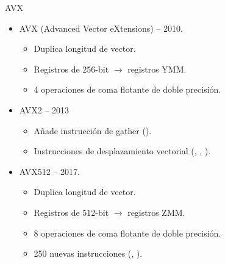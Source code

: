 \begin{frame}[t]{AVX}
\begin{itemize}
  \item AVX (Advanced Vector eXtensions) -- 2010.
    \begin{itemize}
      \item Duplica longitud de vector.
      \item Registros de 256-bit $\rightarrow$ registros YMM.
      \item 4 operaciones de coma flotante de doble precisión.
    \end{itemize}

  \item AVX2 -- 2013
    \begin{itemize}
      \item Añade instrucción de gather ().
      \item Instrucciones de desplazamiento vectorial
            (, , ).
    \end{itemize}

  \item AVX512 -- 2017.
    \begin{itemize}
      \item Duplica longitud de vector.
      \item Registros de 512-bit $\rightarrow$ registros ZMM.
      \item 8 operaciones de coma flotante de doble precisión.
      \item 250 nuevas instrucciones (, ).
    \end{itemize}
\end{itemize}
\end{frame}

